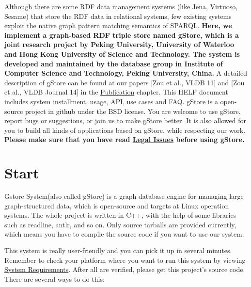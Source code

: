 \documentclass[titlepage, a4paper, 12pt]{article}
\begin{document}
Although there are some RDF data management systems (like Jena, Virtuoso, Sesame) that store the RDF data in relational systems, few existing systems exploit the native graph pattern
matching semantics of SPARQL. \textbf{Here, we implement a graph-based RDF triple store named gStore, which is a joint research project by Peking University, University of Waterloo and Hong Kong University of Science and Technology. The system is developed and maintained by the database group in Institute of Computer Science and Technology, Peking University, China.} A detailed description of gStore can be found at our papers {[}Zou et al., VLDB 11{]} and {[}Zou et al., VLDB Journal 14{]} in the \hyperref[chapter09]{Publication} chapter. This HELP document includes system installment, usage, API, use cases and FAQ. gStore is a open-source project in github under the BSD license. You are welcome to use gStore, report bugs or suggestions, or join us to make gStore better. It is also allowed for you to build all kinds of applications based on gStore, while respecting our work.\\



\textbf{Please make sure that you have read \hyperref[chapter18]{Legal Issues} before using gStore.}

\clearpage

\part{Start}

Gstore System(also called gStore) is a graph database engine for managing large graph-structured data, which is open-source and targets at Linux operation systems. The whole project is written in C++, with the help of some libraries such as readline, antlr, and so on. Only source tarballs are provided currently, which means you have to compile the source code if you want to use our system.


This system is really user-friendly and you can pick it up in several minutes. Remember to check your platform where you want to run this system by viewing \hyperref[chapter01]{System Requirements}. After all are verified, please get this project's source code. There are several ways to do this:
\end{document}
